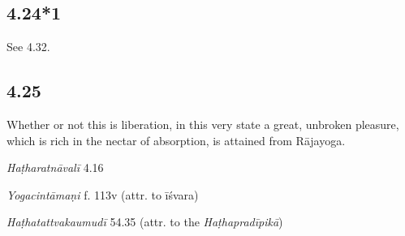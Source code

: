\begin{ekdosis}
\subsection*{4.24*1}



\begin{philcomm}[hp04_024_1]
See 4.32.
\end{philcomm}

\subsection*{4.25}
\begin{translation}[hp04_025]
Whether or not this is liberation, in this very state a great, unbroken pleasure, which is rich in the nectar of absorption, is attained from Rājayoga.
\end{translation}


\begin{testimonia}[hp04_025]
\emph{Haṭharatnāvalī} 4.16
\begin{versinnote}
\end{versinnote}

\emph{Yogacintāmaṇi} f. 113v (attr. to īśvara)
\begin{versinnote}
\end{versinnote}

\emph{Haṭhatattvakaumudī} 54.35 (attr. to the \emph{Haṭhapradīpikā})
\begin{versinnote}
\end{versinnote}
\end{testimonia}


\end{ekdosis}
